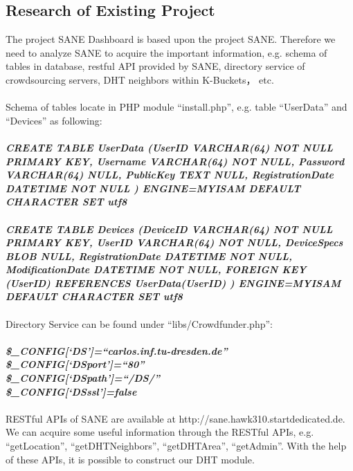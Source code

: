 \documentclass[12pt,oneside,a4paper]{article}
\begin{document}
\subsection{\large Research of Existing Project}
The project SANE Dashboard is based upon the project SANE. Therefore we need to analyze SANE to acquire the important information, e.g. schema of tables in database, restful API provided by SANE, directory service of crowdsourcing servers, DHT neighbors within K-Buckets， etc.\\\\
Schema of tables locate in PHP module ``install.php'', e.g. table ``UserData'' and ``Devices'' as following:\\\\
\scriptsize{\textbf{\emph{CREATE TABLE UserData (UserID VARCHAR(64) NOT NULL PRIMARY KEY, Username VARCHAR(64) NOT NULL, Password VARCHAR(64) NULL, PublicKey TEXT NULL, RegistrationDate DATETIME NOT NULL ) ENGINE=MYISAM DEFAULT CHARACTER SET utf8}}}\\\\
\textbf{\emph{CREATE TABLE Devices (DeviceID VARCHAR(64) NOT NULL PRIMARY KEY, UserID VARCHAR(64) NOT NULL, DeviceSpecs BLOB NULL, RegistrationDate DATETIME NOT NULL, ModificationDate DATETIME NOT NULL, FOREIGN KEY (UserID) REFERENCES UserData(UserID) ) ENGINE=MYISAM DEFAULT CHARACTER SET utf8}}\\\\
\normalsize{Directory Service can be found under ``libs/Crowdfunder.php'':}\\\\
\scriptsize{\textbf{\emph{\$\_CONFIG[`DS']=``carlos.inf.tu-dresden.de''\\
\$\_CONFIG[`DSport']=``80''\\
\$\_CONFIG[`DSpath']=``/DS/''\\
\$\_CONFIG[`DSssl']=false}}}\\\\
\normalsize{RESTful APIs of SANE are available at http://sane.hawk310.startdedicated.de. We can acquire some useful information through the RESTful APIs, e.g. ``getLocation'', ``getDHTNeighbors'', ``getDHTArea'', ``getAdmin''. With the help of these APIs, it is possible to construct our DHT module. }
\end{document}
